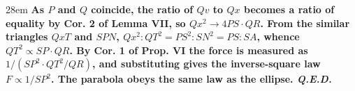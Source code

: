 \documentclass[border=4pt]{standalone}
\begin{document}
\begin{varwidth}{28em}
\large\bfseries
As $P$ and $Q$ coincide, the ratio of $Qv$ to $Qx$ becomes a ratio of equality by      Cor. 2 of Lemma VII, so $Qx^2 \to 4PS \cdot QR$. From the similar triangles $QxT$ and      $SPN$, $Qx^2 : QT^2 = PS^2 : SN^2 = PS : SA$, whence \textcolor{resultred}{$QT^2 \propto SP \cdot QR$}.      By Cor. 1 of Prop. VI the force is measured as $1/(SP^2 \cdot QT^2/QR)$, and substituting      gives the \textcolor{resultred}{inverse-square law $F \propto 1/SP^2$}. The parabola obeys the same      law as the ellipse. \textit{Q.E.D.}
\end{varwidth}
\end{document}

